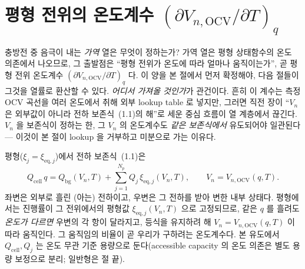 \documentclass[11pt,a4paper]{article}
\newcommand{\eq}{\mathrm{eq}}
\newcommand{\cell}{\mathrm{cell}}
\newcommand{\bg}{\mathrm{bg}}
\newcommand{\OCV}{\mathrm{OCV}}
\begin{document}
\section{평형 전위의 온도계수 $(\partial V_{n,\OCV}/\partial T)_q$}\label{sec:ch2_ocvT}
충방전 중 음극이 내는 \emph{가역} 열은 무엇이 정하는가? 가역 열은 평형 상태함수의 온도 의존에서 나오므로, 그
출발점은 ``평형 전위가 온도에 따라 얼마나 움직이는가'', 곧 평형 전위 온도계수 $(\partial V_{n,\OCV}/\partial T)_q$
다. 이 양을 본 절에서 먼저 확정해야, 다음 절들이 그것을 열률로 환산할 수 있다. \emph{어디서 가져올 것인가}가
관건이다. 흔히 이 계수는 측정 OCV 곡선을 여러 온도에서 취해 외부 lookup table 로 넣지만, 그러면 직전 장이 ``$V_n$
은 외부값이 아니라 전하 보존식~(1.1)의 해''로 세운 중심 흐름이 열 계층에서 끊긴다. $V_n$ 을 보존식이 정하는 한,
그 $V_n$ 의 온도계수도 \emph{같은 보존식에서} 유도되어야 일관된다 — 이것이 본 절이 lookup 을 거부하고 미분으로
가는 이유다.

평형($\xi_j=\xi_{\eq,j}$)에서 전하 보존식~(1.1)은
\begin{equation}
Q_\cell\,q=Q_\bg(V_n,T)+\sum_{j=1}^{N_p}Q_j\,\xi_{\eq,j}(V_n,T),\qquad V_n=V_{n,\OCV}(q,T).
\label{eq:ch2_eqbal}
\end{equation}
좌변은 외부로 흘린 (아는) 전하이고, 우변은 그 전하를 받아 변한 내부 상태다. 평형에서는 진행률이 그 전위에서의
평형값 $\xi_{\eq,j}(V_n,T)$ 으로 고정되므로, 같은 $q$ 를 흘려도 \emph{온도가 다르면} 우변의 각 항이 달라지고, 등식을
유지하려 해 $V_n=V_{n,\OCV}(q,T)$ 이 따라 움직인다. 그 움직임의 비율이 곧 우리가 구하려는 온도계수다. 본 유도에서
$Q_\cell,Q_j$ 는 온도 무관 기준 용량으로 둔다(accessible capacity 의 온도 의존은 별도 용량 보정으로 분리; 일반형은
절 끝).
\end{document}
